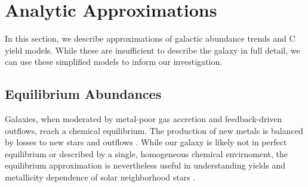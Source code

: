 \documentclass[fleqn,usenatbib]{mnras}
\begin{document}
\section{Analytic Approximations}
In this section, we describe approximations of galactic abundance trends and C yield models. While these are insufficient to describe the galaxy in full detail, we can use these simplified models to inform our investigation.

\subsection{Equilibrium Abundances}\label{sec:equilibrium}

Galaxies, when moderated by metal-poor gas accretion and feedback-driven outflows, reach a chemical equilibrium. The production of new metals is balanced by losses to new stars and outflows \citep{larson72, dalcanton07, FD08, PS11, lilly13}.
While our galaxy is likely not in perfect equilibrium or described by a single, homogeneous chemical
envirnoment, the equilibrium approximation is nevertheless useful in understanding yields and
metallicity dependence of solar neighborhood stars \citep[e.g.][]{james_dwarf,james+23,WAF17}. 
\end{document}
